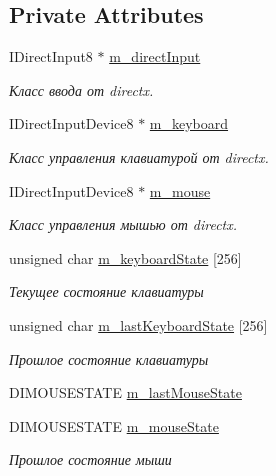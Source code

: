 \subsection*{Private Attributes}
\begin{DoxyCompactItemize}
\item 
I\+Direct\+Input8 $\ast$ \hyperlink{class_input_class_ae46114e00a43f1d7e4c8a3c3e0166d58}{m\+\_\+direct\+Input}
\begin{DoxyCompactList}\small\item\em Класс ввода от directx. \end{DoxyCompactList}\item 
I\+Direct\+Input\+Device8 $\ast$ \hyperlink{class_input_class_ae46f5bf1888ae6b081790296f593b8a9}{m\+\_\+keyboard}
\begin{DoxyCompactList}\small\item\em Класс управления клавиатурой от directx. \end{DoxyCompactList}\item 
I\+Direct\+Input\+Device8 $\ast$ \hyperlink{class_input_class_a44789cd3a335ec6dfed8d0a43d817fa7}{m\+\_\+mouse}
\begin{DoxyCompactList}\small\item\em Класс управления мышью от directx. \end{DoxyCompactList}\item 
unsigned char \hyperlink{class_input_class_a610f4d5c886d009b4591b73746bc6307}{m\+\_\+keyboard\+State} \mbox{[}256\mbox{]}
\begin{DoxyCompactList}\small\item\em Текущее состояние клавиатуры \end{DoxyCompactList}\item 
unsigned char \hyperlink{class_input_class_a1dd991dc90cd8a2c200273776198ec42}{m\+\_\+last\+Keyboard\+State} \mbox{[}256\mbox{]}
\begin{DoxyCompactList}\small\item\em Прошлое состояние клавиатуры \end{DoxyCompactList}\item 
D\+I\+M\+O\+U\+S\+E\+S\+T\+A\+TE \hyperlink{class_input_class_addf19105e308be4cfddd626ddf24ac1c}{m\+\_\+last\+Mouse\+State}
\item 
D\+I\+M\+O\+U\+S\+E\+S\+T\+A\+TE \hyperlink{class_input_class_a00ef77a110a2bfe97ff90bf72f42e81a}{m\+\_\+mouse\+State}
\begin{DoxyCompactList}\small\item\em Прошлое состояние мыши \end{DoxyCompactList}\item 

\end{DoxyCompactItemize}
